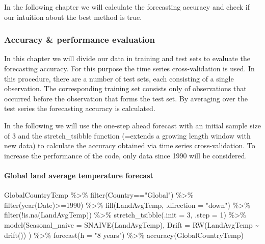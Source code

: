 \documentclass[
]{article}
\newenvironment{Shaded}{\begin{snugshade}}{\end{snugshade}}
\newcommand{\AttributeTok}[1]{\textcolor[rgb]{0.77,0.63,0.00}{#1}}
\newcommand{\DecValTok}[1]{\textcolor[rgb]{0.00,0.00,0.81}{#1}}
\newcommand{\FunctionTok}[1]{\textcolor[rgb]{0.00,0.00,0.00}{#1}}
\newcommand{\NormalTok}[1]{#1}
\newcommand{\SpecialCharTok}[1]{\textcolor[rgb]{0.00,0.00,0.00}{#1}}
\newcommand{\StringTok}[1]{\textcolor[rgb]{0.31,0.60,0.02}{#1}}
\begin{document}
In the following chapter we will calculate the forecasting accuracy and
check if our intuition about the best method is true.

\hypertarget{accuracy-performance-evaluation}{%
\subsubsection{Accuracy \& performance
evaluation}\label{accuracy-performance-evaluation}}

In this chapter we will divide our data in training and test sets to
evaluate the forecasting accuracy. For this purpose the time series
cross-validation is used. In this procedure, there are a number of test
sets, each consisting of a single observation. The corresponding
training set consists only of observations that occurred before the
observation that forms the test set. By averaging over the test series
the forecasting accuracy is calculated.

In the following we will use the one-step ahead forecast with an initial
sample size of 3 and the stretch\_tsibble function (=extends a growing
length window with new data) to calculate the accuracy obtained via time
series cross-validation. To increase the performance of the code, only
data since 1990 will be considered.

\hypertarget{global-land-average-temperature-forecast}{%
\paragraph{Global land average temperature
forecast}\label{global-land-average-temperature-forecast}}

\begin{Shaded}
\begin{Highlighting}[]
\NormalTok{GlobalCountryTemp }\SpecialCharTok{\%\textgreater{}\%} 
  \FunctionTok{filter}\NormalTok{(Country}\SpecialCharTok{==}\StringTok{"Global"}\NormalTok{) }\SpecialCharTok{\%\textgreater{}\%} 
  \FunctionTok{filter}\NormalTok{(}\FunctionTok{year}\NormalTok{(Date)}\SpecialCharTok{\textgreater{}=}\DecValTok{1990}\NormalTok{) }\SpecialCharTok{\%\textgreater{}\%}
  \FunctionTok{fill}\NormalTok{(LandAvgTemp, }\AttributeTok{.direction =} \StringTok{"down"}\NormalTok{) }\SpecialCharTok{\%\textgreater{}\%}
  \FunctionTok{filter}\NormalTok{(}\SpecialCharTok{!}\FunctionTok{is.na}\NormalTok{(LandAvgTemp)) }\SpecialCharTok{\%\textgreater{}\%}
  \FunctionTok{stretch\_tsibble}\NormalTok{(}\AttributeTok{.init =} \DecValTok{3}\NormalTok{, }\AttributeTok{.step =} \DecValTok{1}\NormalTok{) }\SpecialCharTok{\%\textgreater{}\%} 
  \FunctionTok{model}\NormalTok{(}\AttributeTok{Seasonal\_naive =} \FunctionTok{SNAIVE}\NormalTok{(LandAvgTemp),}
        \AttributeTok{Drift =} \FunctionTok{RW}\NormalTok{(LandAvgTemp }\SpecialCharTok{\textasciitilde{}} \FunctionTok{drift}\NormalTok{())}
\NormalTok{        ) }\SpecialCharTok{\%\textgreater{}\%} \FunctionTok{forecast}\NormalTok{(}\AttributeTok{h =} \StringTok{"8 years"}\NormalTok{) }\SpecialCharTok{\%\textgreater{}\%} 
  \FunctionTok{accuracy}\NormalTok{(GlobalCountryTemp)}
\end{Highlighting}
\end{Shaded}
\end{document}
